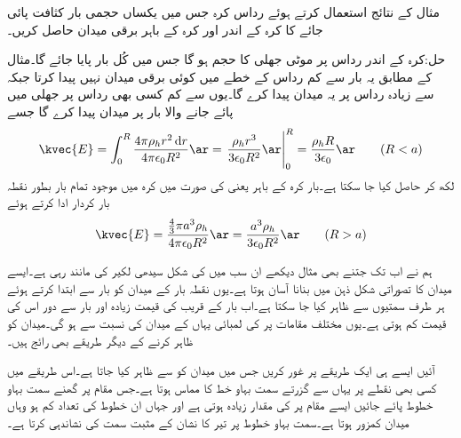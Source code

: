 مثال  کے نتائج استعمال کرتے ہوئے   رداس کرہ جس میں یکساں  حجمی بار کثافت پائی جائے کا کرہ کے اندر اور کرہ کے باہر برقی میدان  حاصل کریں۔

حل:کرہ کے اندر رداس  پر  موٹی جھلی کا حجم  ہو گا جس میں کُل  بار پایا جائے گا۔مثال   کے مطابق یہ بار  سے کم رداس کے خطے میں کوئی برقی میدان نہیں پیدا کرتا جبکہ  سے زیادہ رداس پر یہ میدان پیدا کرے گا۔یوں  سے کم کسی بھی رداس پر جھلی میں پائے جانے والا بار  پر میدان پیدا کرے گا جسے
\begin{align}
\kvec{E}=\int_0^{R} \frac{4\pi \rho_h r^2 \dif r}{4\pi \epsilon_0 R^2} \ar=\left. \frac{\rho_h r^3}{3\epsilon_0 R^2} \ar\right|_0^R=\frac{\rho_h R}{3\epsilon_0}\ar \quad \quad (R<a)
\end{align}
لکھ کر حاصل کیا جا سکتا ہے۔بار کرہ کے باہر یعنی  کی صورت میں کرہ میں موجود تمام بار بطور نقطہ بار کردار ادا کرتے ہوئے
\begin{align}
\kvec{E}=\frac{\frac{4}{3} \pi a^3 \rho_h}{4\pi \epsilon_0 R^2}\ar=\frac{ a^3 \rho_h}{3\epsilon_0 R^2}\ar  \quad \quad (R>a)
\end{align}

ہم نے اب تک جتنے بھی مثال دیکھے ان سب میں  کی شکل سیدھی لکیر کی مانند رہی ہے۔ایسے میدان کا تصوراتی شکل ذہن میں بنانا آسان ہوتا ہے۔یوں نقطہ بار کے میدان کو بار سے ابتدا کرتے ہوئے ہر طرف سمتیوں سے ظاہر کیا جا سکتا ہے۔اب بار کے قریب  کی قیمت زیادہ اور بار سے دور اس کی قیمت کم ہوتی ہے۔یوں مختلف مقامات پر  کی لمبائی یہاں کے میدان کی نسبت سے ہو گی۔میدان کو ظاہر کرنے کے دیگر طریقے بھی رائج ہیں۔

آئیں ایسے ہی ایک طریقے پر غور کریں جس میں میدان کو  سے ظاہر کیا جاتا ہے۔اس طریقے میں کسی بھی نقطے  پر  یہاں سے گزرتے سمت بہاو خط کا مماس ہوتا ہے۔جس مقام پر گھنے سمت بہاو خطوط  پائے جائیں ایسے مقام پر  کی مقدار زیادہ ہوتی ہے اور جہاں ان خطوط کی تعداد کم ہو وہاں میدان کمزور ہوتا ہے۔سمت بہاو خطوط پر تیر کا نشان  کے مثبت سمت کی نشاندہی کرتا ہے۔
 
